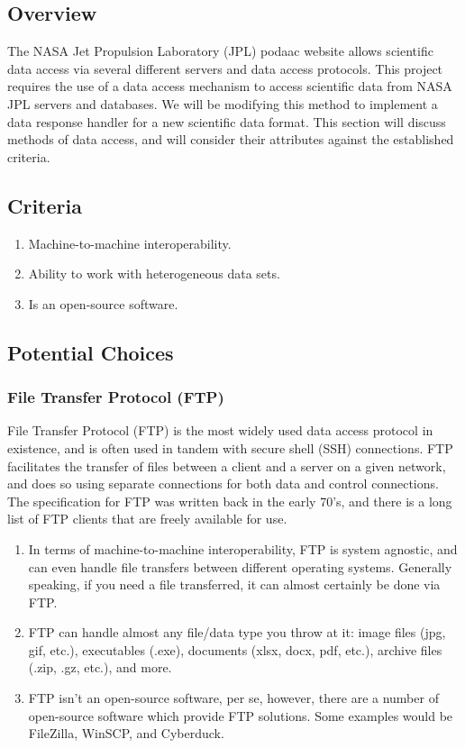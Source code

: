 \documentclass[onecolumn, draftclsnofoot,10pt, compsoc]{IEEEtran}
\begin{document}
\subsection{Overview}
The NASA Jet Propulsion Laboratory (JPL) podaac website allows scientific data access via several different servers and data access protocols. This project requires the use of a data access mechanism to access scientific data from NASA JPL servers and databases. We will be modifying this method to implement a data response handler for a new scientific data format. This section will discuss methods of data access, and will consider their attributes against the established criteria.

\subsection{Criteria}
\begin{enumerate}
\item Machine-to-machine interoperability.
\item Ability to work with heterogeneous data sets.
\item Is an open-source software.
\end{enumerate}
\subsection{Potential Choices}

\subsubsection{File Transfer Protocol (FTP)}
File Transfer Protocol (FTP) is the most widely used data access protocol in existence, and is often used in tandem with secure shell (SSH) connections. FTP facilitates the transfer of files between a client and a server on a given network, and does so using separate connections for both data and control connections. The specification for FTP was written back in the early 70's, and there is a long list of FTP clients that are freely available for use. 

\begin{enumerate}
\item In terms of machine-to-machine interoperability, FTP is system agnostic, and can even handle file transfers between different operating systems. Generally speaking, if you need a file transferred, it can almost certainly be done via FTP.
\item FTP can handle almost any file/data type you throw at it: image files (jpg, gif, etc.), executables (.exe), documents (xlsx, docx, pdf, etc.), archive files (.zip, .gz, etc.), and more.
\item FTP isn’t an open-source software, per se, however, there are a number of open-source software which provide FTP solutions. Some examples would be FileZilla, WinSCP, and Cyberduck.
\end{enumerate}
\end{document}
